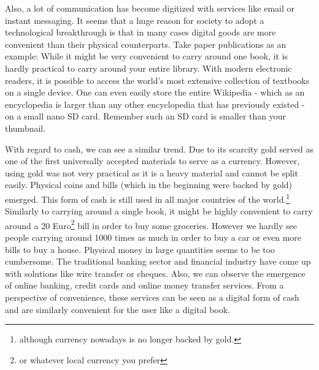 \documentclass[a4paper,12pt,oneside,openany]{book}
\begin{document}
Also, a lot of communication has become digitized with services like
email or instant messaging.  It seems that a huge reason for society to
adopt a technological breakthrough is that in many cases digital goods
are more convenient than their physical counterparts.  Take paper
publications as an example: While it might be very convenient to carry
around one book, it is hardly practical to carry around your entire
library.  With modern electronic readers, it is possible to access the
world's most extensive collection of textbooks on a single device.  One
can even easily store the entire Wikipedia - which as an encyclopedia is
larger than any other encyclopedia that has previously existed - on a
small nano SD card.  Remember such an SD card is smaller than your
thumbnail.

With regard to cash, we can see a similar trend.  Due to its scarcity
gold served as one of the first universally accepted materials to serve
as a currency.  However, using gold was not very practical as it is a
heavy material and cannot be split easily.  Physical coins and bills
(which in the beginning were backed by gold) emerged.  This form of cash
is still used in all major countries of the world.\footnote{although
  currency nowadays is no longer backed by gold.}  Similarly to carrying
around a single book, it might be highly convenient to carry around a 20
Euro\footnote{or whatever local currency you prefer} bill in order to
buy some groceries. However we hardly see people carrying around 1000
times as much in order to buy a car or even more bills to buy a house.
Physical money in large quantities seems to be too cumbersome.  The
traditional banking sector and financial industry have come up with
solutions like wire transfer or cheques.  Also, we can observe the
emergence of online banking, credit cards and online money transfer
services.  From a perspective of convenience, these services can be seen
as a digital form of cash and are similarly convenient for the user like
a digital book.
\end{document}
